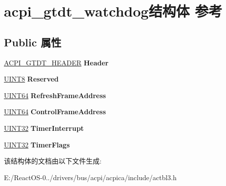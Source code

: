 \hypertarget{structacpi__gtdt__watchdog}{}\section{acpi\+\_\+gtdt\+\_\+watchdog结构体 参考}
\label{structacpi__gtdt__watchdog}
\subsection*{Public 属性}
\begin{DoxyCompactItemize}
\item 
\mbox{\label{structacpi__gtdt__watchdog_a02bc3a3563fac964e86e786b8bf64453}} 
\hyperlink{structacpi__gtdt__header}{A\+C\+P\+I\+\_\+\+G\+T\+D\+T\+\_\+\+H\+E\+A\+D\+ER} {\bfseries Header}
\item 
\mbox{\label{structacpi__gtdt__watchdog_a58ce1a467aa6f98ba44b304ac135a768}} 
\hyperlink{_processor_bind_8h_ab27e9918b538ce9d8ca692479b375b6a}{U\+I\+N\+T8} {\bfseries Reserved}
\item 
\mbox{\label{structacpi__gtdt__watchdog_afe35dba64999243dad512fe9ee406461}} 
\hyperlink{_processor_bind_8h_a57be03562867144161c1bfee95ca8f7c}{U\+I\+N\+T64} {\bfseries Refresh\+Frame\+Address}
\item 
\mbox{\label{structacpi__gtdt__watchdog_a2d19ddb81fb8d4a59cc6ecf980b86914}} 
\hyperlink{_processor_bind_8h_a57be03562867144161c1bfee95ca8f7c}{U\+I\+N\+T64} {\bfseries Control\+Frame\+Address}
\item 
\mbox{\label{structacpi__gtdt__watchdog_aeb4cf999705a8d98e19ae5e22b44c874}} 
\hyperlink{_processor_bind_8h_ae1e6edbbc26d6fbc71a90190d0266018}{U\+I\+N\+T32} {\bfseries Timer\+Interrupt}
\item 
\mbox{\label{structacpi__gtdt__watchdog_a16fec64f840a6a83521c75423d517d30}} 
\hyperlink{_processor_bind_8h_ae1e6edbbc26d6fbc71a90190d0266018}{U\+I\+N\+T32} {\bfseries Timer\+Flags}
\end{DoxyCompactItemize}


该结构体的文档由以下文件生成\+:\begin{DoxyCompactItemize}
\item 
E\+:/\+React\+O\+S-\/0../drivers/bus/acpi/acpica/include/actbl3.\+h\end{DoxyCompactItemize}
